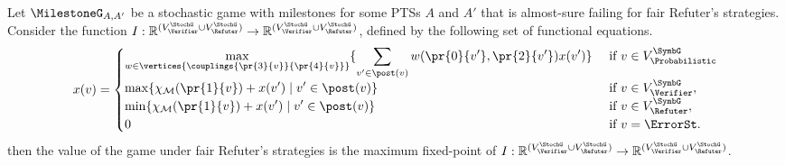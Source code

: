 \begin{theorem} Let $\MilestoneG_{A,A'}$ be a stochastic game with milestones for some PTSs $A$ and $A'$ that is almost-sure 
failing for fair Refuter's strategies. 
Consider the function 
$I: \mathbb{R}^{(V^\StochG_\Verifier \cup V^\StochG_\Refuter)} \rightarrow  \mathbb{R}^{(V^\StochG_\Verifier \cup V^\StochG_\Refuter)}$, defined by the following set of functional equations.
\[
    x(v) =
    \begin{cases}
           \displaystyle \max_{w \in \vertices{\couplings{\pr{3}{v}}{\pr{4}{v}}}} \{\sum_{v' \in \post(v)} w(\pr{0}{v'},\pr{2}{v'})  x(v') \}& \text{ if }v \in V^{\SymbG}_\Probabilistic  \\
           \displaystyle \max \{\chi_{\mathcal{M}}(\pr{1}{v})  + x(v') \mid v' \in \post(v) \} & \text{ if } v \in  V^{\SymbG}_\Verifier, \\
           \displaystyle \min \{\chi_{\mathcal{M}}(\pr{1}{v})  + x(v') \mid v' \in \post(v) \} & \text{ if } v \in  V^{\SymbG}_\Refuter, \\
           \displaystyle 0 & \text{ if } v=\ErrorSt.
           \displaystyle 
    \end{cases}
\]
then the value of the game under fair Refuter's strategies is the maximum fixed-point of 
$I: \mathbb{R}^{(V^\StochG_\Verifier \cup V^\StochG_\Refuter)} \rightarrow  \mathbb{R}^{(V^\StochG_\Verifier \cup V^\StochG_\Refuter)}$.
\end{theorem}
